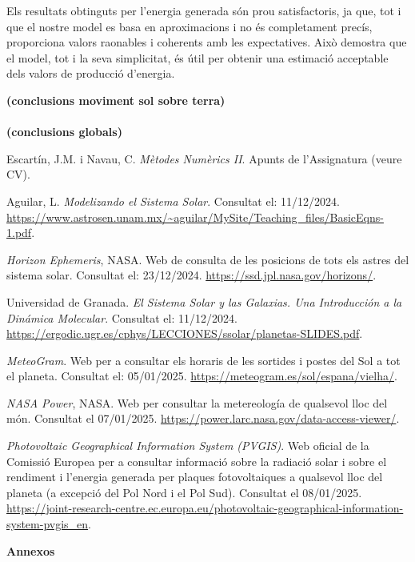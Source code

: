 \documentclass[10pt, twoside, a4paper]{article}
\begin{document}
Els resultats obtinguts per l'energia generada són prou satisfactoris, ja que, tot i que el nostre model es basa en aproximacions i no és completament precís, proporciona valors raonables i coherents amb les expectatives. Això demostra que el model, tot i la seva simplicitat, és útil per obtenir una estimació acceptable dels valors de producció d'energia.


\textbf{(conclusions moviment sol sobre terra)}
\\
\\
\textbf{(conclusions globals)}

\newpage
\begin{thebibliography}{99}
    Escartín, J.M. i Navau, C. \textit{Mètodes Numèrics II}. Apunts de l'Assignatura (veure CV).

    Aguilar, L. \textit{Modelizando el Sistema Solar}. Consultat el: 11/12/2024. \url{https://www.astrosen.unam.mx/~aguilar/MySite/Teaching_files/BasicEqns-1.pdf}.

    \textit{Horizon Ephemeris}, NASA. Web de consulta de les posicions de tots els astres del sistema solar. Consultat el: 23/12/2024. \url{https://ssd.jpl.nasa.gov/horizons/}.

    Universidad de Granada. \textit{El Sistema Solar y las Galaxias. Una Introducción a la Dinámica Molecular}. Consultat el: 11/12/2024. \url{https://ergodic.ugr.es/cphys/LECCIONES/ssolar/planetas-SLIDES.pdf}.

    \textit{MeteoGram}. Web per a consultar els horaris de les sortides i postes del Sol a tot el planeta. Consultat el: 05/01/2025. \url{https://meteogram.es/sol/espana/vielha/}.

    \textit{NASA Power}, NASA. Web per consultar la metereología de qualsevol lloc del món. Consultat el 07/01/2025. \url{https://power.larc.nasa.gov/data-access-viewer/}.

    \textit{Photovoltaic Geographical Information System (PVGIS)}. Web oficial de la Comissió Europea per a consultar informació sobre la radiació solar i sobre el rendiment i l'energia generada per plaques fotovoltaiques a qualsevol lloc del planeta (a excepció del Pol Nord i el Pol Sud). Consultat el 08/01/2025. \url{https://joint-research-centre.ec.europa.eu/photovoltaic-geographical-information-system-pvgis_en}.
\end{thebibliography}

\newpage
\appendix
{\Huge{\textbf{Annexos}}}
\end{document}
